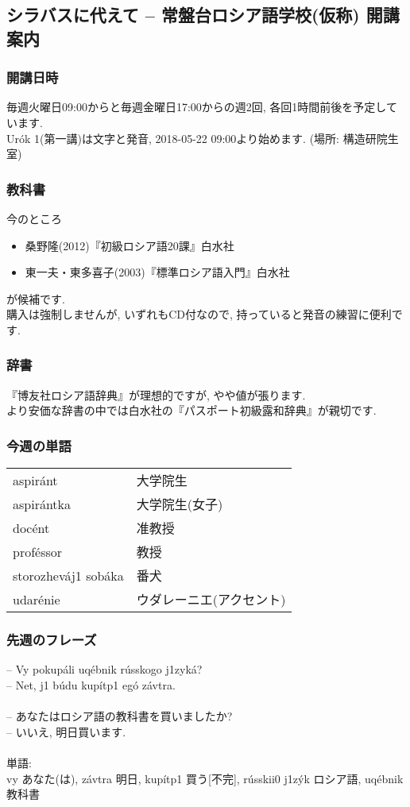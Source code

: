 \documentclass[11pt]{jsarticle}
\begin{document}
\subsection*{シラバスに代えて \--- 常盤台ロシア語学校(仮称) 開講案内}
\subsubsection*{開講日時}
\noindent
毎週火曜日09:00からと毎週金曜日17:00からの週2回, 各回1時間前後を予定しています.\\
Ur\'ok 1(第一講)は文字と発音, 2018-05-22 09:00より始めます. (場所: 構造研院生室)
\subsubsection*{教科書}
今のところ
\begin{itemize}
  \item 桑野隆(2012)『初級ロシア語20課』白水社
  \item 東一夫・東多喜子(2003)『標準ロシア語入門』白水社
\end{itemize}
が候補です.\\
購入は強制しませんが, いずれもCD付なので, 持っていると発音の練習に便利です.
\subsubsection*{辞書}
『博友社ロシア語辞典』が理想的ですが, やや値が張ります.\\
より安価な辞書の中では白水社の『パスポート初級露和辞典』が親切です.
\subsubsection*{今週の単語}
\begin{table}[ht]
  \begin{tabular}{ll}
    aspir\'ant & 大学院生\\
    aspir\'antka & 大学院生(女子)\\
    doc\'ent & 准教授\\
    prof\'essor & 教授\\
    storo{zh}ev\'a{j1} sob\'aka & 番犬\\
    udar\'enie & ウダレーニエ(アクセント)
  \end{tabular}
\end{table}
\subsubsection*{先週のフレーズ}
\noindent
\--- Vy pokup\'ali uq\'ebnik r\'usskogo {j1}zyk\'a?\\
\--- Net, {j1} b\'udu kup\'it{p1} eg\'o z\'avtra.\\
\\
\--- あなたはロシア語の教科書を買いましたか?\\
\--- いいえ, 明日買います.\\
\\
単語:\\vy あなた(は), z\'avtra 明日, kup\'it{p1} 買う[不完], r\'usski{i0} {j1}z\'yk ロシア語, uq\'ebnik 教科書
\end{document}
